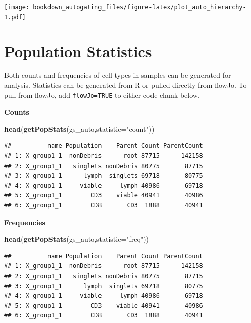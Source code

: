 \documentclass[]{book}
\newenvironment{Shaded}{\begin{snugshade}}{\end{snugshade}}
\newcommand{\DataTypeTok}[1]{\textcolor[rgb]{0.13,0.29,0.53}{#1}}
\newcommand{\KeywordTok}[1]{\textcolor[rgb]{0.13,0.29,0.53}{\textbf{#1}}}
\newcommand{\NormalTok}[1]{#1}
\newcommand{\StringTok}[1]{\textcolor[rgb]{0.31,0.60,0.02}{#1}}
\begin{document}
\texttt{[image: bookdown\_autogating\_files/figure-latex/plot\_auto\_hierarchy-1.pdf]}

\hypertarget{population-statistics}{%
\section{Population Statistics}\label{population-statistics}}

Both counts and frequencies of cell types in samples can be generated for analysis. Statistics can be generated from R or pulled directly from flowJo. To pull from flowJo, add \texttt{flowJo=TRUE} to either code chunk below.

\textbf{Counts}

\begin{Shaded}
\begin{Highlighting}[]
\KeywordTok{head}\NormalTok{(}\KeywordTok{getPopStats}\NormalTok{(gs_auto,}\DataTypeTok{statistic=}\StringTok{"count"}\NormalTok{))}
\end{Highlighting}
\end{Shaded}

\begin{verbatim}
##          name Population    Parent Count ParentCount
## 1: X_group1_1  nonDebris      root 87715      142158
## 2: X_group1_1   singlets nonDebris 80775       87715
## 3: X_group1_1      lymph  singlets 69718       80775
## 4: X_group1_1     viable     lymph 40986       69718
## 5: X_group1_1        CD3    viable 40941       40986
## 6: X_group1_1        CD8       CD3  1888       40941
\end{verbatim}

\textbf{Frequencies}

\begin{Shaded}
\begin{Highlighting}[]
\KeywordTok{head}\NormalTok{(}\KeywordTok{getPopStats}\NormalTok{(gs_auto,}\DataTypeTok{statistic=}\StringTok{"freq"}\NormalTok{))}
\end{Highlighting}
\end{Shaded}

\begin{verbatim}
##          name Population    Parent Count ParentCount
## 1: X_group1_1  nonDebris      root 87715      142158
## 2: X_group1_1   singlets nonDebris 80775       87715
## 3: X_group1_1      lymph  singlets 69718       80775
## 4: X_group1_1     viable     lymph 40986       69718
## 5: X_group1_1        CD3    viable 40941       40986
## 6: X_group1_1        CD8       CD3  1888       40941
\end{verbatim}
\end{document}
